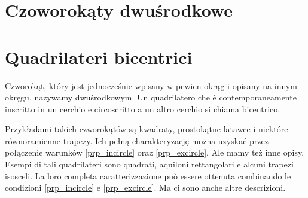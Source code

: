 
%

\section{Czoworokąty dwuśrodkowe} %
\section{Quadrilateri bicentrici} %

\begin{definition}
Czworokąt, który jest jednocześnie wpisany w pewien okrąg i opisany na innym okręgu, nazywamy dwuśrodkowym. %
Un quadrilatero che è contemporaneamente inscritto in un cerchio e circoscritto a un altro cerchio si chiama bicentrico. %
\end{definition}

Przykładami takich czworokątów są kwadraty, prostokątne latawce i niektóre równoramienne trapezy. %
Ich pełną charakteryzację można uzyskać przez połączenie warunków \ref{prp_incircle} oraz \ref{prp_excircle}. %
Ale mamy też inne opisy. %
Esempi di tali quadrilateri sono quadrati, aquiloni rettangolari e alcuni trapezi isosceli. %
La loro completa caratterizzazione può essere ottenuta combinando le condizioni \ref{prp_incircle} e \ref{prp_excircle}. %
Ma ci sono anche altre descrizioni. %

